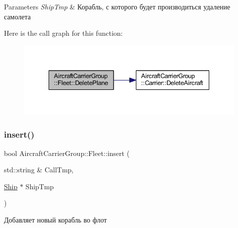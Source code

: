 \begin{DoxyParams}{Parameters}
{\em Ship\+Tmp} & Корабль, с которого будет производиться удаление самолета \\
\hline
\end{DoxyParams}
Here is the call graph for this function\+:
\nopagebreak
\begin{figure}[H]
\begin{center}
\leavevmode
\includegraphics[width=335pt]{class_aircraft_carrier_group_1_1_fleet_aa464eecb22e71128b6a01733d71fc27e_cgraph}
\end{center}
\end{figure}
\mbox{\label{class_aircraft_carrier_group_1_1_fleet_ac2f313e4be33de186169699fe37163ab}} 
\subsubsection{\texorpdfstring{insert()}{insert()}}
{\footnotesize\ttfamily bool Aircraft\+Carrier\+Group\+::\+Fleet\+::insert (\begin{DoxyParamCaption}\item[{std\+::string \&}]{Call\+Tmp,  }\item[{\mbox{\hyperlink{class_aircraft_carrier_group_1_1_ship}{Ship}} $\ast$}]{Ship\+Tmp }\end{DoxyParamCaption})}



Добавляет новый корабль во флот 


